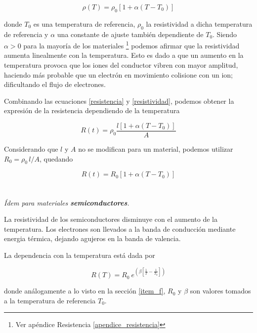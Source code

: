 \documentclass[10pt,a4paper]{article}
\begin{document}
		\begin{equation}\label{resistividad}
			\rho(T) = \rho_{0} \left[ 1 + \alpha (T - T_0) \right]
		\end{equation}

		donde $T_0$ es una temperatura de referencia, $\rho_0$ la resistividad a dicha temperatura de referencia y $\alpha$ una constante de ajuste también dependiente de $T_0$. Siendo $\alpha > 0$ para la mayoría de los materiales \footnote{Ver apéndice Resistencia \ref{apendice_resistencia}} podemos afirmar que la resistividad aumenta linealmente con la temperatura. Esto es dado a que un aumento en la temperatura provoca que los iones del conductor vibren con mayor amplitud, haciendo más probable que un electrón en movimiento colisione con un ion; dificultando el flujo de electrones.

		Combinando las ecuaciones \ref{resistencia} y \ref{resistividad}, podemos obtener la expresión de la resistencia dependiendo de la temperatura

		\begin{equation}
			R(t) = \rho_0 \frac{l \left[ 1 + \alpha (T - T_0) \right] }{A}
		\end{equation}
		
		Considerando que $l$ y $A$ no se modifican para un material, podemos utilizar $R_0 = \rho_0 \, l/A$, quedando

		\begin{equation}
			R(t) = R_0 \left[ 1 + \alpha (T - T_0) \right]
		\end{equation}

	\section{}
		\textit{
			Ídem para materiales \textbf{semiconductores}.
		}

		La resistividad de los semiconductores disminuye con el aumento de la temperatura. Los electrones son llevados a la banda de conducción mediante energia térmica, dejando agujeros en la banda de valencia.

		La dependencia con la temperatura está dada por

		\begin{equation}
			R(T) = R_0 \: e^{\left(\displaystyle \beta \left[\frac{1}{T} - \frac{1}{T_0} \right] \right)}
		\end{equation}

		donde análogamente a lo visto en la sección \ref{item_f}, $R_0$ y $\beta$ son valores tomados a la temperatura de referencia $T_0$.
\end{document}
